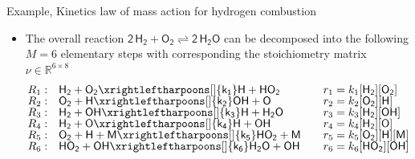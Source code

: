\begin{frame}{Example, Kinetics law of mass action for hydrogen combustion}
		\begin{itemize}
		\item The overall reaction $\mathsf{2 \, H_2 + O_2 \rightleftharpoons 2\, H_2O}$ can be 
		decomposed into the following $M=6$ elementary steps with corresponding 
		the stoichiometry matrix $\nu \in \mathbb{R}^{6 \times 8}$
			\lcol
			{\scriptsize
			\begin{alignat*}{4}
				R_1:  & \quad \mathsf{H_2 + O_2 \xrightleftharpoons[]{k_1} H + HO_2}    & \quad & r_1 = k_1  \mathsf{[H_2][O_2] } \\[-5pt]
				R_2: & \quad \mathsf{O_2 + H \xrightleftharpoons[]{k_2} OH + O}           && r_2 = k_2  \mathsf{[O_2][H] } \\[-5pt]
				R_3: & \quad \mathsf{H_2 + OH \xrightleftharpoons[]{k_3} H + H_2O}     && r_3 = k_3  \mathsf{[H_2][OH] } \\[-5pt]
				R_4: & \quad \mathsf{H_2 + O \xrightleftharpoons[]{k_4} H + OH}           && r_4 = k_4  \mathsf{[H_2][O] } \\[-5pt]
				R_5: & \quad \mathsf{O_2 + H + M \xrightleftharpoons[]{k_5} HO_2 + M} && r_5 = k_5  \mathsf{[O_2][H][M] } \\[-5pt]
				R_6: & \quad \mathsf{HO_2 + OH \xrightleftharpoons[]{k_6} H_2O + OH} && r_6 = k_6  \mathsf{[HO_2][OH] }
			\end{alignat*}
			}
			\rcol
			{\small
				\vskip -30pt
			\only<1	>{
			\[
			\nu = 
			\kbordermatrix{
				& \mathsf{H} & \mathsf{H_2} & \mathsf{HO_2} & \mathsf{H_2O} & \mathsf{O} & \mathsf{O_2} & \mathsf{OH} & \mathsf{M} \\
				R_1 &   1 & -1 & 1 & 0 & 0 & \alert{*} & 0 & 0\\[10pt]
				R_2 & -1 &  0 & 0 & 0 & 1 & \alert{*} & 1 & 0\\[10pt]
				R_3 &   1 & -1 & 0 & 1 & 0 & \alert{*} & -1 & 0\\[5pt]
				R_4 &  1 & -1 & 0 & 0 & -1 & \alert{*} & 1 & 0\\[5pt]
				R_5 & -1 &  0 & 1 & 0 & 0 & \alert{*} & 0 & 0\\[5pt]
				R_6 &  0 &  0 & -1 & 1 & 0 & \alert{*} & 0 & 0\\[5pt]
			}
			\]
			}
			}
\end{itemize}
\end{frame}
